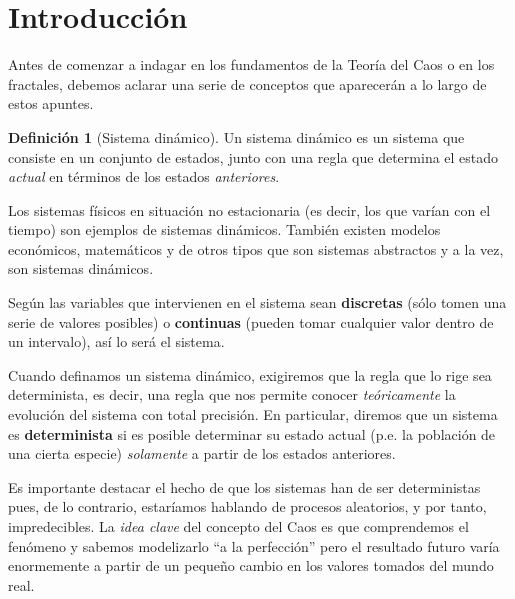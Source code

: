 \newtheorem{theorem}{Teorema}[section]
\newtheorem{lemma}{Lema}[section]
\newtheorem{proposition}{Proposición}[section]
\theoremstyle{definition}
\newtheorem{definition}{Definición}[section]
\newtheorem{example}{Ejemplo}[section]

\renewcommand{\headrulewidth}{0.5pt}








\tableofcontents
\newpage

\section{Introducción}
Antes de comenzar a indagar en los fundamentos de la Teoría del Caos o en los fractales, debemos aclarar una serie de conceptos que aparecerán a lo largo de estos apuntes.

\begin{definition}[Sistema dinámico]\label{def:sistemaDinamico}
Un sistema dinámico es un sistema que consiste en un conjunto de estados, junto con una regla que determina el estado \emph{actual} en términos de los estados \emph{anteriores}.
\end{definition}

Los sistemas físicos en situación no estacionaria (es decir, los que varían con el tiempo) son ejemplos de sistemas dinámicos. También existen modelos económicos, matemáticos y de otros tipos que son sistemas abstractos y a la vez, son sistemas dinámicos.

Según las variables que intervienen en el sistema sean \textbf{discretas} (sólo tomen una serie de valores posibles) o \textbf{continuas} (pueden tomar cualquier valor dentro de un intervalo), así lo será el sistema.

Cuando definamos un sistema dinámico, exigiremos que la regla que lo rige sea determinista, es decir, una regla que nos permite conocer \emph{teóricamente} la evolución del sistema con total precisión. En particular, diremos que un sistema es \textbf{determinista} si es posible determinar su estado actual (p.e. la población de una cierta especie) \emph{solamente} a partir de los estados anteriores.

Es importante destacar el hecho de que los sistemas han de ser deterministas pues, de lo contrario, estaríamos hablando de procesos aleatorios, y por tanto, impredecibles. La \emph{idea clave} del concepto del Caos es que comprendemos el fenómeno y sabemos modelizarlo ``a la perfección'' pero el resultado futuro varía enormemente a partir de un pequeño cambio en los valores tomados del mundo real.



